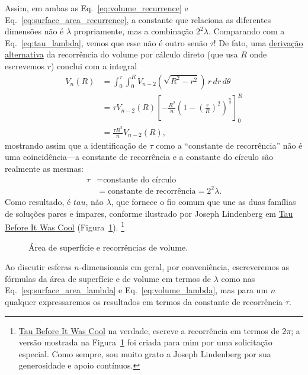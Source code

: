 {Assim, em ambas as Eq.~\eqref{eq:volume_recurrence} e Eq.~\eqref{eq:surface_area_recurrence}, a constante que relaciona as diferentes dimensões não é $\lambda$ propriamente, mas a combinação $2^2\lambda$. Comparando com a Eq.~\eqref{eq:tau_lambda}, vemos que esse não é outro senão $\tau$! De fato, uma \href{https://en.wikipedia.org/wiki/Volume_of_an_n-ball#The_two-dimension_recursion_formula}{derivação alternativa} da recorrência do volume por cálculo direto (que usa $R$ onde escrevemos $r$) conclui com a integral
\begin{equation}
\label{eq:integral_recurrence}
\begin{split}
V_n(R) & = \int_0^\tau \int_0^R V_{n-2}\left(\sqrt{R^2 - r^2}\right) \,r\,dr\,d\theta \\
       & = \tau V_{n-2}(R) \left[-\frac{R^2}{n}\left(1 - \left(\frac{r}{R}\right)^2\right)^\frac{n}{2}\right]_{0}^{R} \\
       & = \frac{\tau R^2}{n} V_{n-2}(R),
\end{split}
\end{equation}
mostrando assim que a identificação de $\tau$ como a ``constante de recorrência'' não é uma coincidência---a constante de recorrência e a constante do círculo são realmente as mesmas:
\[
\begin{split}
\tau & = \mbox{constante do círculo} \\
     & = \mbox{constante de recorrência} = 2^2\lambda.
\end{split}
\]
Como resultado, é $tau$, não $\lambda$, que fornece o fio comum que une as duas famílias de soluções pares e ímpares, conforme ilustrado por Joseph Lindenberg em \href{http://sites.google.com/site/taubeforeitwascool/}{Tau Before It Was Cool} (Figura~\ref{fig:Nspheres}). \footnote{\href{http://sites.google.com/site/taubeforeitwascool/}{Tau Before It Was Cool} na verdade, escreve a recorrência em termos de $2\pi$; a versão mostrada na Figura~\ref{fig:Nspheres} foi criada para mim por uma solicitação especial. Como sempre, sou muito grato a Joseph Lindenberg por sua generosidade e apoio contínuos.}

\begin{figure}
\begin{center}
\end{center}
\caption{Área de superfície e recorrências de volume.\label{fig:Nspheres}}
\end{figure}

Ao discutir esferas $n$-dimensionais em geral, por conveniência, \linebreak escreveremos as fórmulas da área de superfície e de volume em termos de $\lambda$ como nas Eq.~\eqref{eq:surface_area_lambda} e Eq.~\eqref{eq:volume_lambda}, mas para um $n$ qualquer expressaremos os resultados em termos da constante de recorrência $\tau$.

}
